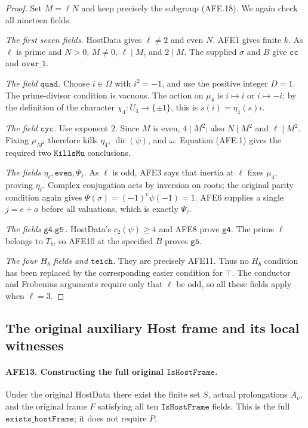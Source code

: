 \begin{proof}
Set \(M=\ell N\) and keep precisely the subgroup
(AFE.18).  We again check all nineteen fields.

\emph{The first seven fields.}
HostData gives \(\ell\ne2\) and even \(N\).
AFE1 gives finite \(k\).
As \(\ell\) is prime and \(N>0\),
\(M\ne0\), \(\ell\mid M\), and \(2\mid M\).
The supplied \(\sigma\) and \(B\) give
\(\texttt{cc}\) and \(\texttt{over\_l}\).

\emph{The field \(\texttt{quad}\).}
Choose \(i\in\Omega\) with \(i^2=-1\), and use the
positive integer \(D=1\).
The prime-divisor condition is vacuous.
The action on \(\mu_4\) is \(i\mapsto i\) or
\(i\mapsto-i\); by the definition of the character
\(\chi_4:U_4\to\{\pm1\}\), this is
\(s(i)=\eta_4(s)i\).

\emph{The field \(\texttt{cyc}\).}
Use exponent \(2\).
Since \(M\) is even, \(4\mid M^2\);
also \(N\mid M^2\) and \(\ell\mid M^2\).
Fixing \(\mu_{M^2}\) therefore kills \(\eta_4\),
\(\operatorname{dir}(\psi)\), and \(\omega\).
Equation (AFE.1) gives the required two
\(\texttt{KillsMu}\) conclusions.

\emph{The fields \(\eta_\ell,\texttt{even},\Psi_\ell\).}
As \(\ell\) is odd, AFE3 says that inertia at
\(\ell\) fixes \(\mu_4\), proving \(\eta_\ell\).
Complex conjugation acts by inversion on roots;
the original parity condition again gives
\(\Psi(\sigma)=(-1)^e\psi(-1)=1\).
AFE6 supplies a single \(j=e+a\) before all
valuations, which is exactly \(\Psi_\ell\).

\emph{The fields \(\texttt{g4},\texttt{g5}\).}
HostData's \(c_2(\psi)\ge4\) and AFE8 prove
\(\texttt{g4}\).
The prime \(\ell\) belongs to \(T_b\), so AFE10
at the specified \(B\) proves \(\texttt{g5}\).

\emph{The four \(H_b\) fields and \(\texttt{teich}\).}
They are precisely AFE11.
Thus no \(H_b\) condition has been replaced by the
corresponding easier condition for \(\top\).
The conductor and Frobenius arguments require only
that \(\ell\) be odd, so all these fields apply when
\(\ell=3\).
\end{proof}

\subsection{The original auxiliary Host frame and its local witnesses}

\paragraph{AFE13. Constructing the full original \(\texttt{IsHostFrame}\).}
\label{claim:AFE13}
Under the original HostData there exist the finite
set \(S\), actual prolongations \(A_v\), and the
original frame \(F\) satisfying all ten
\(\texttt{IsHostFrame}\) fields.
This is the full \(\texttt{exists\_hostFrame}\);
it does not require \(P\).

